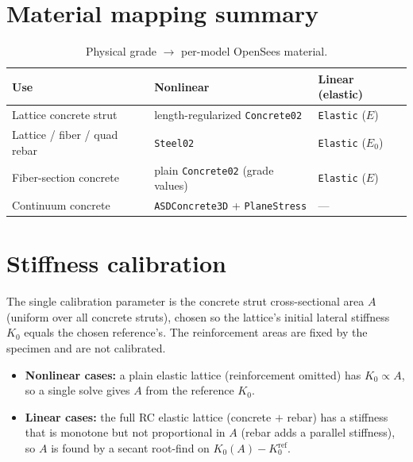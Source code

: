 \documentclass[11pt]{article}
\newcommand{\code}[1]{\texttt{#1}}
\begin{document}
\section{Material mapping summary}
\label{sec:matmap}

\begin{table}[H]
\centering
\caption{Physical grade $\to$ per-model OpenSees material.}
\begin{tabular}{l l l}
\toprule
Use & Nonlinear & Linear (elastic) \\
\midrule
Lattice concrete strut       & length-regularized \code{Concrete02} & \code{Elastic} ($E$) \\
Lattice / fiber / quad rebar & \code{Steel02} & \code{Elastic} ($E_0$) \\
Fiber-section concrete       & plain \code{Concrete02} (grade values) & \code{Elastic} ($E$) \\
Continuum concrete           & \code{ASDConcrete3D} + \code{PlaneStress} & --- \\
\bottomrule
\end{tabular}
\end{table}

\section{Stiffness calibration}
\label{sec:calib}

The single calibration parameter is the concrete strut cross-sectional area $A$ (uniform over all
concrete struts), chosen so the lattice's initial lateral stiffness $K_0$ equals the chosen
reference's. The reinforcement areas are fixed by the specimen and are not calibrated.

\begin{itemize}
\item \textbf{Nonlinear cases:} a plain elastic lattice (reinforcement omitted) has
      $K_0 \propto A$, so a single solve gives $A$ from the reference $K_0$.
\item \textbf{Linear cases:} the full RC elastic lattice (concrete $+$ rebar) has a stiffness that
      is monotone but not proportional in $A$ (rebar adds a parallel stiffness), so $A$ is found by
      a secant root-find on $K_0(A)-K_0^{\mathrm{ref}}$.
\end{itemize}
\end{document}
